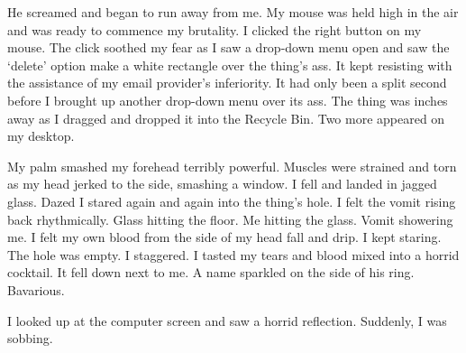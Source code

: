 He screamed and began to run away from me. My mouse was held high
in the air and was ready to commence my brutality. I clicked the
right button on my mouse. The click soothed my fear as I saw a
drop-down menu open and saw the `delete' option make a
white rectangle over the thing's ass. It kept resisting with the
assistance of my email provider's inferiority. It had only
been a split second before I brought up another drop-down menu over
its ass. The thing was inches away as I dragged and dropped it into
the Recycle Bin. Two more appeared on my desktop.

My palm smashed my forehead terribly powerful. Muscles were
strained and torn as my head jerked to the side, smashing a window.
I fell and landed in jagged glass. Dazed I stared again and again
into the thing's hole. I felt the vomit rising back rhythmically.
Glass hitting the floor. Me hitting the glass. Vomit showering me.
I felt my own blood from the side of my head fall and drip. I kept
staring. The hole was empty. I staggered. I tasted my tears and
blood mixed into a horrid cocktail. It fell down next to me. A name
sparkled on the side of his ring. Bavarious.

I looked up at the computer screen and saw a horrid reflection.
Suddenly, I was sobbing. 
 



